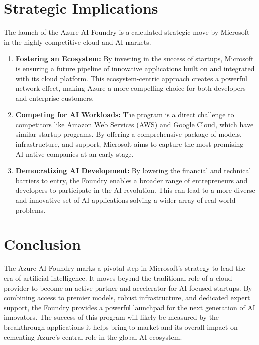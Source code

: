 \documentclass{article}
\begin{document}
\section{Strategic Implications}
The launch of the Azure AI Foundry is a calculated strategic move by Microsoft in the highly competitive cloud and AI markets. 

\begin{enumerate}
    \item \textbf{Fostering an Ecosystem:} By investing in the success of startups, Microsoft is ensuring a future pipeline of innovative applications built on and integrated with its cloud platform. This ecosystem-centric approach creates a powerful network effect, making Azure a more compelling choice for both developers and enterprise customers.
    \item \textbf{Competing for AI Workloads:} The program is a direct challenge to competitors like Amazon Web Services (AWS) and Google Cloud, which have similar startup programs. By offering a comprehensive package of models, infrastructure, and support, Microsoft aims to capture the most promising AI-native companies at an early stage.
    \item \textbf{Democratizing AI Development:} By lowering the financial and technical barriers to entry, the Foundry enables a broader range of entrepreneurs and developers to participate in the AI revolution. This can lead to a more diverse and innovative set of AI applications solving a wider array of real-world problems.
\end{enumerate}

\section{Conclusion}
The Azure AI Foundry marks a pivotal step in Microsoft's strategy to lead the era of artificial intelligence. It moves beyond the traditional role of a cloud provider to become an active partner and accelerator for AI-focused startups. By combining access to premier models, robust infrastructure, and dedicated expert support, the Foundry provides a powerful launchpad for the next generation of AI innovators. The success of this program will likely be measured by the breakthrough applications it helps bring to market and its overall impact on cementing Azure's central role in the global AI ecosystem.
\end{document}
